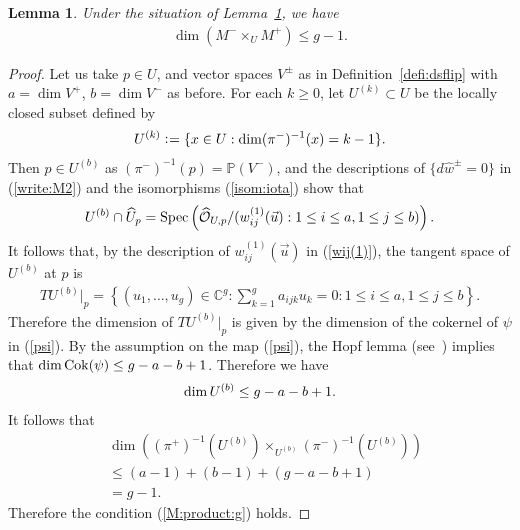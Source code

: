 \documentclass[11pt]{amsart}
\theoremstyle{plain}
\newtheorem{lem}[thm]{Lemma}
\newcommand{\oO}{\mathcal{O}}
\newcommand{\Spec}{\mathop{\rm Spec}\nolimits}
\newcommand{\Cok}{\mathop{\rm Cok}\nolimits}
\begin{document}
\begin{lem}\label{lem:smooth2}
Under the situation of Lemma~\ref{lem:smooth2}, we have
\begin{align}\label{M:product:g}
\dim (M^- \times_U M^+) \le g-1.
\end{align}
\end{lem}
\begin{proof}
Let us take $p \in U$, 
and vector spaces $V^{\pm}$ as in Definition~\ref{defi:dsflip}
with  
$a=\dim V^+$, $b=\dim V^-$ as before. 
For each $k\ge 0$,
let $U^{(k)} \subset U$ be the locally closed subset 
defined by
\begin{align*}
U^{(k)} \cneq \{x \in U : \dim (\pi^-)^{-1}(x)=k-1\}.
\end{align*}
Then $p \in U^{(b)}$
as $(\pi^-)^{-1}(p)=\mathbb{P}(V^-)$, and 
the descriptions of $\{d\widehat{w}^{\pm}=0\}$ in 
(\ref{write:M2}) 
and the isomorphisms (\ref{isom:iota}) show that 
\begin{align*}
U^{(b)} \cap \widehat{U}_p
=\Spec\left(\widehat{\oO}_{U, p}/(w_{ij}^{(1)}(\vec{u}) : 1\le i \le a, 1\le j\le b) \right).
\end{align*}
It follows that, by the description of $w_{ij}^{(1)}(\vec{u})$ in (\ref{wij(1)}), 
the tangent space of $U^{(b)}$ at $p$ is 
\begin{align*}
TU^{(b)}|_{p}=\left\{  (u_1, \ldots, u_g) \in \mathbb{C}^g : 
\sum_{k=1}^g a_{ijk} u_k=0 : 
1\le i\le a, 1\le j\le b \right\}. 
\end{align*}
Therefore the dimension of $TU^{(b)}|_{p}$ is given by 
the dimension of the cokernel of $\psi$ in (\ref{psi}). 
By the assumption on the map (\ref{psi}), 
the Hopf lemma (see~\cite[Lemma~2]{Ginensky})
implies that 
$\dim \Cok(\psi) \le g-a-b+1$. 
Therefore 
we have
\begin{align}\notag
\dim U^{(b)} \le g-a-b+1.
\end{align}
It follows that
\begin{align*}
&\dim \left( (\pi^+)^{-1}(U^{(b)}) \times_{U^{(b)}} (\pi^-)^{-1}(U^{(b)}) \right) \\
&\le (a-1)+(b-1)+(g-a-b+1) \\
&=g-1.
\end{align*}
Therefore the condition (\ref{M:product:g}) holds. 
\end{proof}
\end{document}
